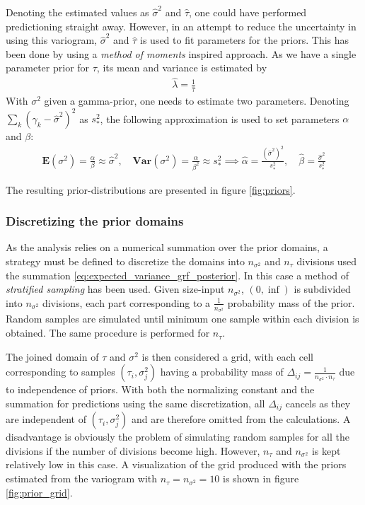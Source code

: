 \documentclass{article}
\begin{document}
Denoting the estimated values as $\hat{\sigma}^2$ and $\hat{\tau}$, one could have performed predictioning straight away. However, in an attempt to reduce the uncertainty in using this variogram, $\hat{\sigma}^2$ and $\hat{\tau}$ is used to fit parameters for the priors. This has been done by using a \textit{method of moments} inspired approach. As we have a single parameter prior for $\tau$, its mean and variance is estimated by 
\begin{align}
\hat{\lambda} = \frac{1}{\hat{\tau}}
\end{align}
With $\sigma^2$ given a gamma-prior, one needs to estimate two parameters. Denoting $\sum_k (\gamma_k - \hat{\sigma}^2)^2$ as $s_*^2$, the following approximation is used to set parameters $\alpha$ and $\beta$:
\begin{align}
\mathbf{E}(\sigma^2) = \frac{\alpha}{\beta} \approx \hat{\sigma}^2, \quad
\mathbf{Var}(\sigma^2) = \frac{\alpha}{\beta^2} \approx s_*^2 
\implies 
\hat{\alpha} = \frac{(\hat{\sigma}^2)^2}{s_*^2}, \quad  \hat{\beta} = \frac{\hat{\sigma}^2}{s_*^2}
\end{align}

The resulting prior-distributions are presented in figure \ref{fig:priors}.

\subsubsection{Discretizing the prior domains}
As the analysis relies on a numerical summation over the prior domains, a strategy must be defined to discretize the domains into $n_{\sigma^2}$ and $n_{\tau}$ divisions used the summation \ref{eq:expected_variance_grf_posterior}. In this case a method of \textit{stratified sampling} has been used. Given size-input $n_{\sigma^2}$, $(0,\inf)$ is subdivided into $n_{\sigma^2}$ divisions, each part corresponding to a $\frac{1}{n_{\sigma^2}}$ probability mass of the prior. Random samples are simulated until minimum one sample within each division is obtained. The same procedure is performed for $n_{\tau}$. 

The joined domain of $\tau$ and $\sigma^2$ is then considered a grid, with each cell corresponding to samples $(\tau_i, \sigma_j^2)$ having a probability mass of $\Delta_{ij} = \frac{1}{n_{\sigma^2} \cdot n_{\tau}}$ due to independence of priors. With both the normalizing constant and the summation for predictions using the same discretization, all $\Delta_{ij}$ cancels as they are independent of $(\tau_i, \sigma_j^2)$ and are therefore omitted from the calculations. A disadvantage is obviously the problem of simulating random samples for all the divisions if the number of divisions become high. However, $n_{\tau}$ and $n_{\sigma^2}$ is kept relatively low in this case. A visualization of the grid produced with the priors estimated from the variogram with $n_{\tau} = n_{\sigma^2} = 10$ is shown in figure \ref{fig:prior_grid}. 
\end{document}
